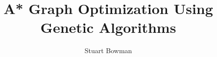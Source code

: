 \documentclass[twocolumn]{article}
\begin{document}
\title {A* Graph Optimization Using Genetic Algorithms}
\author{Stuart Bowman}
\maketitle





%

%
\end{document}
